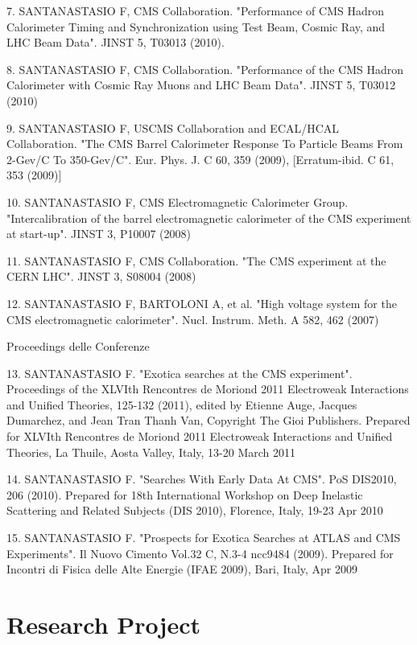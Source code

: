 \documentclass[10pt, a4paper]{article}
\begin{document}
7. SANTANASTASIO F, CMS Collaboration. "Performance of CMS Hadron Calorimeter Timing and Synchronization using Test Beam, Cosmic Ray, and LHC Beam Data". JINST 5, T03013 (2010).

8. SANTANASTASIO F, CMS Collaboration. "Performance of the CMS Hadron Calorimeter with Cosmic Ray Muons and LHC Beam Data". JINST 5, T03012 (2010)

9. SANTANASTASIO F, USCMS Collaboration and ECAL/HCAL Collaboration. "The CMS Barrel Calorimeter Response To Particle Beams From 2-Gev/C To 350-Gev/C". Eur. Phys. J.  C 60, 359 (2009), [Erratum-ibid.  C 61, 353 (2009)] 

10. SANTANASTASIO F, CMS Electromagnetic Calorimeter Group. "Intercalibration of the barrel electromagnetic calorimeter of the CMS  experiment at start-up". JINST 3, P10007 (2008)

11. SANTANASTASIO F, CMS Collaboration. "The CMS experiment at the CERN LHC". JINST 3, S08004 (2008)

12. SANTANASTASIO F,  BARTOLONI A, et al. "High voltage system for the CMS electromagnetic calorimeter". Nucl. Instrum. Meth.  A 582, 462 (2007)


Proceedings delle Conferenze

13. SANTANASTASIO F. "Exotica searches at the CMS experiment". Proceedings of the XLVIth Rencontres de Moriond 2011 Electroweak Interactions and Unified Theories, 125-132 (2011), edited by Etienne Auge, Jacques Dumarchez, and Jean Tran Thanh Van, Copyright The Gioi Publishers. Prepared for XLVIth Rencontres de Moriond 2011 Electroweak Interactions and Unified Theories, La Thuile, Aosta Valley, Italy, 13-20 March 2011

14. SANTANASTASIO F. "Searches With Early Data At CMS". PoS DIS2010, 206 (2010). Prepared for 18th International Workshop on Deep Inelastic Scattering and Related Subjects (DIS 2010), Florence, Italy, 19-23 Apr 2010

15. SANTANASTASIO F. "Prospects for Exotica Searches at ATLAS and CMS Experiments". Il Nuovo Cimento Vol.32 C, N.3-4 ncc9484 (2009). Prepared for Incontri di Fisica delle Alte Energie (IFAE 2009), Bari, Italy, Apr 2009

 
\section*{Research Project}
\end{document}

